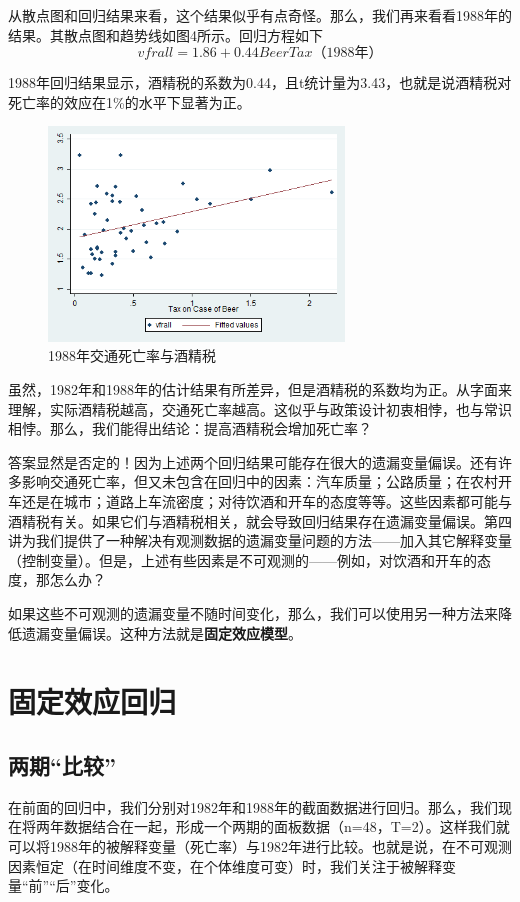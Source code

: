 \documentclass[cn,10pt,math=newtx,citestyle=gb7714-2015,bibstyle=gb7714-2015]{elegantbook}
\begin{document}
从散点图和回归结果来看，这个结果似乎有点奇怪。那么，我们再来看看1988年的结果。其散点图和趋势线如图4所示。回归方程如下
\begin{equation}
	vfrall=1.86+0.44BeerTax（1988年）
\end{equation}

1988年回归结果显示，酒精税的系数为0.44，且t统计量为3.43，也就是说酒精税对死亡率的效应在1\%的水平下显著为正。
\begin{figure}[htbp]
	\centering
	\includegraphics[width=0.7\textwidth]{1988.png}
	\caption{1988年交通死亡率与酒精税}\label{fig:digit}
\end{figure}

虽然，1982年和1988年的估计结果有所差异，但是酒精税的系数均为正。从字面来理解，实际酒精税越高，交通死亡率越高。这似乎与政策设计初衷相悖，也与常识相悖。那么，我们能得出结论：提高酒精税会增加死亡率？

答案显然是否定的！因为上述两个回归结果可能存在很大的遗漏变量偏误。还有许多影响交通死亡率，但又未包含在回归中的因素：汽车质量；公路质量；在农村开车还是在城市；道路上车流密度；对待饮酒和开车的态度等等。这些因素都可能与酒精税有关。如果它们与酒精税相关，就会导致回归结果存在遗漏变量偏误。第四讲为我们提供了一种解决有观测数据的遗漏变量问题的方法——加入其它解释变量（控制变量）。但是，上述有些因素是不可观测的——例如，对饮酒和开车的态度，那怎么办？

如果这些不可观测的遗漏变量不随时间变化，那么，我们可以使用另一种方法来降低遗漏变量偏误。这种方法就是\textbf{固定效应模型}。

\section{固定效应回归}
\subsection{两期“比较”}
在前面的回归中，我们分别对1982年和1988年的截面数据进行回归。那么，我们现在将两年数据结合在一起，形成一个两期的面板数据（n=48，T=2）。这样我们就可以将1988年的被解释变量（死亡率）与1982年进行比较。也就是说，在不可观测因素恒定（在时间维度不变，在个体维度可变）时，我们关注于被解释变量“前”“后”变化。
\end{document}
